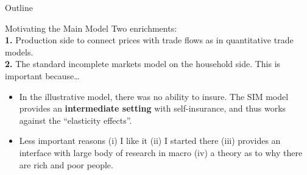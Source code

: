 \documentclass[9pt,pdftex,aspectratio=1610]{beamer}
\theoremstyle{definition}
\begin{document}

\begin{frame}[t]{Outline}
\smallskip
{}
\bigskip
{}
\bigskip{}
\end{frame}


\begin{frame}[t]{Motivating the Main Model}
\smallskip
Two enrichments:\\
\medskip
\textbf{1.} Production side to connect prices with trade flows as in quantitative trade models.\\
\bigskip
\textbf{2.} The standard incomplete markets model on the household side. This is important because\ldots
\begin{itemize}
\smallskip
\item In the illustrative model, there was no ability to insure. The SIM model provides an \textbf{intermediate setting} with self-insurance, and thus works against the ``elasticity effects''.
\smallskip
\item Less important reasons (i) I like it (ii) I started there (iii) provides an interface with large body of research in macro (iv) a theory as to why there are rich and poor people.
\end{itemize}
\end{frame}

\end{document}
